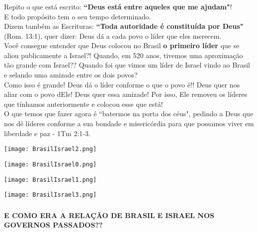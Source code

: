 \documentclass[aspectratio=169]{beamer}
\begin{document}
\begin{frame}
\small
	  \frametitle{}
	  \framesubtitle{}
	    \centering
		Repito o que está escrito: \textbf{``Deus está entre aqueles que me ajudam"}! \\
	E todo propósito tem o seu tempo determinado.\\
	Dizem também as Escrituras: \textbf{``Toda autoridade é constituída por Deus"} (Rom. 13:1), quer dizer: Deus dá a cada povo o líder que eles merecem. \\
	\vspace{.5cm}
	Você consegue entender que Deus colocou no Brasil \textbf{o primeiro líder} que se aliou publicamente a Israel?! Quando, em 520 anos, tivemos uma aproximação tão grande com Israel?? Quando foi que vimos um líder de Israel vindo ao Brasil e selando uma amizade entre os dois povos? \\
	Como isso é grande! Deus dá o líder conforme o que o povo é!! Deus quer nos aliar com o povo dEle! Deus quer essa amizade! Por isso, Ele removeu os líderes que tínhamos anteriormente e colocou esse que está!\\
		O que temos que fazer agora é ``batermos na porta dos céus", pedindo a Deus que nos dê líderes conforme a sua bondade e misericórdia para que possamos viver em liberdade e paz - 1Tm 2:1-3.
	\end{frame}

		\begin{frame}
	  \texttt{[image: BrasilIsrael2.png]}
	\end{frame}

	\begin{frame}
	  \texttt{[image: BrasilIsrael0.png]}
	\end{frame}
	
		\begin{frame}
	  \texttt{[image: BrasilIsrael1.png]}
	\end{frame}
	
			\begin{frame}
	  \texttt{[image: BrasilIsrael3.png]}
	\end{frame}
	
	\begin{frame}
		  \frametitle{}
	  \framesubtitle{}
      \begin{center}
              {\LARGE \textbf{E COMO ERA A RELAÇÃO DE BRASIL}}
              {\LARGE \textbf{E ISRAEL NOS GOVERNOS PASSADOS??}}
      \end{center}
	\end{frame}
	
\end{document}
